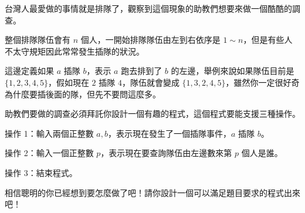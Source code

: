 台灣人最愛做的事情就是排隊了，觀察到這個現象的助教們想要來做一個酷酷的調查。

整個排隊隊伍會有 $n$ 個人，一開始排隊隊伍由左到右依序是 $1 \sim n$，但是有些人不太守規矩因此常常發生插隊的狀況。

這邊定義如果 $a$ 插隊 $b$，表示 $a$ 跑去排到了 $b$ 的左邊，舉例來說如果隊伍目前是 $\{1,2,3,4,5\}$，假如現在 $2$ 插隊 $4$，隊伍就會變成 $\{1,3,2,4,5\}$，雖然你一定很好奇為什麼要插後面的隊，但先不要問這麼多。

助教們要做的調查必須拜託你設計一個有趣的程式，這個程式要能支援三種操作。

操作 1：輸入兩個正整數 $a,b$，表示現在發生了一個插隊事件，$a$ 插隊 $b$。

操作 2：輸入一個正整數 $p$，表示現在要查詢隊伍由左邊數來第 $p$ 個人是誰。

操作 3：結束程式。

相信聰明的你已經想到要怎麼做了吧！請你設計一個可以滿足題目要求的程式出來吧！
